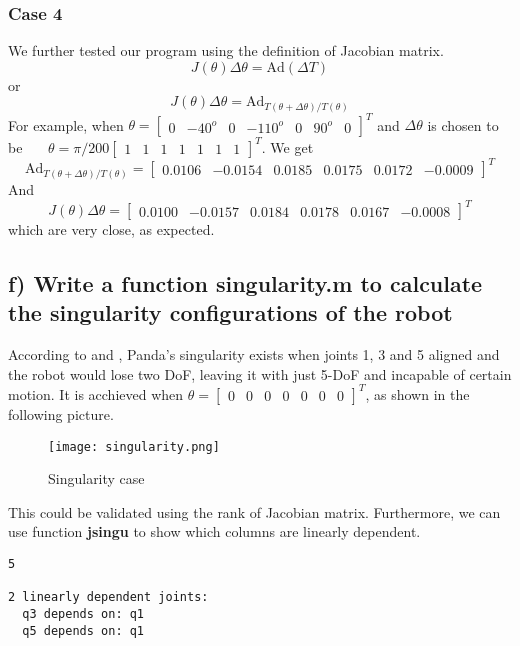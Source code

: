 \documentclass[english,10pt,a4paper]{article}
\begin{document}
    \subsubsection*{Case 4}
    We further tested our program using the definition of Jacobian matrix.
    \begin{equation}
        J(\theta)\Delta \theta = \text{Ad}(\Delta T)
    \end{equation}
    or
    \begin{equation}
        J(\theta)\Delta \theta = \text{Ad}_{T(\theta + \Delta \theta) / T(\theta)}
    \end{equation}
    For example, when $\theta = \begin{bmatrix}
        0 & -40^o & 0 & -110^o & 0 & 90^o & 0
    \end{bmatrix}^T$ and $\Delta\theta$ is chosen to be \ \ \ $\theta = \pi/200\begin{bmatrix}
        1 & 1 & 1 & 1 & 1 & 1 & 1
    \end{bmatrix}^T$. We get
    \begin{equation}
        \text{Ad}_{T(\theta + \Delta \theta) / T(\theta)} = \begin{bmatrix}
                0.0106 &   -0.0154 &   0.0185 &   0.0175 &   0.0172 &  -0.0009
        \end{bmatrix}^T
    \end{equation}
    And 
    \begin{equation}
        J(\theta)\Delta \theta = \begin{bmatrix}
                0.0100 &   -0.0157 &   0.0184 &   0.0178 &   0.0167 &  -0.0008
        \end{bmatrix}^T
    \end{equation}
    which are very close, as expected.
    \subsection*{f) Write a function \textbf{singularity.m} to calculate the singularity configurations of the robot}
    According to \cite{Hepanda} and \cite{Tittelpanda}, Panda's singularity exists when joints 1, 3 and 5 aligned and the robot would lose two DoF, leaving it with just 5-DoF and incapable of certain motion. It is acchieved when $\theta = \begin{bmatrix}
        0 & 0 & 0 & 0 & 0 & 0 & 0
    \end{bmatrix}^T$, as shown in the following picture. 
    \begin{figure}[H]
        \centering
        \texttt{[image: singularity.png]}
        \caption{Singularity case}
        \label{fig:enter-label}
    \end{figure}
    This could be validated using the rank of Jacobian matrix. Furthermore, we can use function \textbf{jsingu} to show which columns are linearly dependent.
    \begin{lstlisting}[style=matlab]
         5

2 linearly dependent joints:
  q3 depends on: q1 
  q5 depends on: q1 
    \end{lstlisting}
\end{document}
